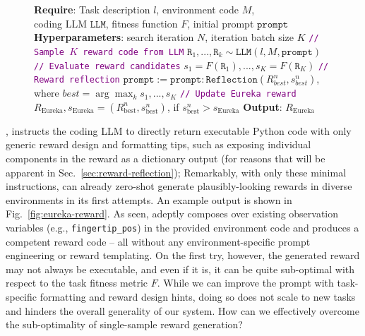 \begin{figure}
\begin{minipage}{0.6\textwidth}
\begin{algorithm}[H]
\caption{\ourmethod}
\label{algo:eureka}
\begin{algorithmic}[1]
\small
\STATE \textbf{Require}: Task description $l$, environment code $M$, \\ 
coding LLM $\texttt{LLM}$, fitness function $F$, initial prompt $\texttt{prompt}$
\STATE \textbf{Hyperparameters}: search iteration $N$, iteration batch size $K$
\STATE \textcolor{purple}{\texttt{// Sample $K$ reward code from LLM}}
\STATE $\texttt{R}_1,..., \texttt{R}_k \sim \texttt{LLM}(l, M, \texttt{prompt})$ 
\STATE \textcolor{purple}{\texttt{// Evaluate reward candidates}}
\STATE $s_1 =F(\texttt{R}_1), ..., s_K = F(\texttt{R}_K)$
\STATE \textcolor{purple}{\texttt{// Reward reflection}}
\STATE $\texttt{prompt} := \texttt{prompt} : \texttt{Reflection}(R^n_{best}, s^n_{best})$,\\ 
where $best = \arg \max_{k} s_1,...,s_K$
\STATE \textcolor{purple}{\texttt{// Update Eureka reward}}
\STATE $R_{\text{Eureka}}, s_{\text{Eureka}} = (R^n_{\text{best}}, s^n_{\text{best}})$, \quad if $s^n_{\text{best}} > s_{\text{Eureka}}$
\ENDFOR
\STATE \textbf{Output}: $R_{\text{Eureka}}$
\end{algorithmic}
\end{algorithm}
\end{minipage}
\end{figure}




, \ourmethod instructs the coding LLM to directly return executable Python code with only generic reward design and formatting tips, such as exposing individual components in the reward as a dictionary output (for reasons that will be apparent in Sec.~\ref{sec:reward-reflection}); 
Remarkably, with only these minimal instructions, \ourmethod can already zero-shot generate plausibly-looking rewards in diverse environments in its first attempts. An example \ourmethod output is shown in Fig.~\ref{fig:eureka-reward}. As seen, \ourmethod adeptly composes over existing observation variables (e.g., \texttt{fingertip\_pos}) in the provided environment code and produces a competent reward code -- all without any environment-specific prompt engineering or reward templating. On the first try, however, the generated reward may not always be executable, and even if it is, it can be quite sub-optimal with respect to the task fitness metric $F$. While we can improve the prompt with task-specific formatting and reward design hints, doing so does not scale to new tasks and hinders the overall generality of our system. How can we effectively overcome the sub-optimality of single-sample reward generation?  




